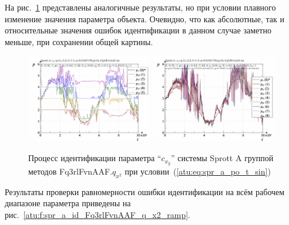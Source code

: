 На рис.~\ref{atu:f:spr_a_id_Fq3rlFvnAAF_q_x2_sin} представлены аналогичные результаты,
но при условии плавного изменение значения параметра объекта. Очевидно, что
как абсолютные, так и относительные значения ошибок идентификации в данном случае заметно
меньше, при сохранении общей картины.

\begin{figure}[htb!]
  \centerline{
    \includegraphics[width=0.49\textwidth]{p/cha/spr_a/Fq3rlFvnAAF_x2/sprott_a_id-p_t_pi_Fq3rlFvnAAF_sin.png}
    \hfill
    \includegraphics[width=0.49\textwidth]{p/cha/spr_a/Fq3rlFvnAAF_x2/sprott_a_id-p_t_p_Fq3rlFvnAAF_sin.png}
  }
  \caption{Процесс идентификации параметра ``$c_{x_y}$'' системы Sprott A группой методов Fq3rlFvnAAF.$q_{x^2}$ при условии~(\ref{atu:eq:spr_a_po_t_sin})}
  \label{atu:f:spr_a_id_Fq3rlFvnAAF_q_x2_sin}
\end{figure}

Результаты проверки равномерности ошибки идентификации на всём рабочем диапазоне параметра
приведены на рис.~\ref{atu:f:spr_a_id_Fq3rlFvnAAF_q_x2_ramp}.


